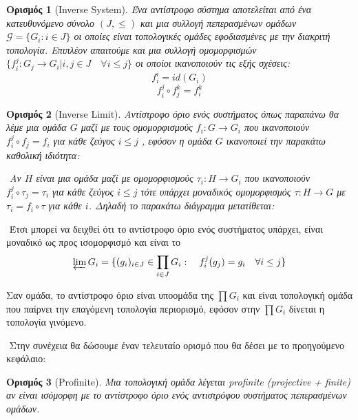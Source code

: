 \documentclass[oneside,a4paper]{article}
\newtheorem*{defn}{Ορισμός}
\newcommand {\tl}{\textlatin}
\begin{document}
\begin{defn}[\tl{Inverse System}] Ένα αντίστροφο σύστημα αποτελείται από ένα κατευθυνόμενο σύνολο $(J,\leq )$ και μια συλλογή πεπερασμένων ομάδων $\mathcal{G} = \{G_i : i \in J\}$ οι οποίες είναι τοπολογικές ομάδες εφοδιασμένες με την διακριτή τοπολογία. Επιπλέον απαιτούμε και μια συλλογή ομομορφισμών $\{f^j_i : G_j \rightarrow G_i | i,j \in J \quad\forall i\leq j\}$ οι οποίοι ικανοποιούν τις εξής σχέσεις:
$$f^i_i = id(G_i)$$
$$f^j_i \circ f^k_j = f^k_i$$
\end{defn}

\begin{defn}[\tl{Inverse Limit}] Αντίστροφο όριο ενός συστήματος όπως παραπάνω θα λέμε μια ομάδα $G$ μαζί με τους ομομορφισμούς $f_i : G \rightarrow G_i$ που ικανοποιούν $f^j_i \circ f_j = f_i$ για κάθε ζεύγος $i \leq j$ , εφόσον η ομάδα $G$ ικανοποιεί την παρακάτω καθολική ιδιότητα:

$ $\newline
Αν $H$ είναι μια ομάδα μαζί με ομομορφισμούς $\tau_i : H \rightarrow G_i$ που ικανοποιούν $f^j_i \circ \tau_j = \tau_i$ για κάθε ζεύγος $i\leq j$ τότε υπάρχει μοναδικός ομομορφισμός $\tau : H  \rightarrow G$ με $\tau_i = f_i \circ \tau$ για κάθε $i$. Δηλαδή το παρακάτω διάγραμμα μετατίθεται:
\end{defn}
\begin{center}
\end{center}



$ $\newline
Έτσι μπορεί να δειχθεί ότι το αντίστροφο όριο ενός συστήματος υπάρχει, είναι μοναδικό ως προς ισομορφισμό και είναι το 
$$\varprojlim G_i  = \{(g_i)_{i \in J} \in \prod\limits_{i \in J} G_i : \quad f^j_i (g_j) = g_i \quad\forall i\leq j\}$$

\noindent Σαν ομάδα, το αντίστροφο όριο είναι υποομάδα της $\prod G_i$ και είναι τοπολογική ομάδα που παίρνει την επαγόμενη τοπολογία περιορισμό, εφόσον στην $\prod G_i$ δίνεται η τοπολογία γινόμενο.

$ $\newline
\noindent Στην συνέχεια θα δώσουμε έναν τελευταίο ορισμό που θα δέσει με το προηγούμενο κεφάλαιο:

\begin{defn}[\tl{Profinite}]Μια τοπολογική ομάδα λέγεται \tl{profinite (projective + finite)} αν είναι ισόμορφη με το αντίστροφο όριο ενός αντιστρόφου συστήματος πεπερασμένων ομάδων. 
\end{defn}
\end{document}
